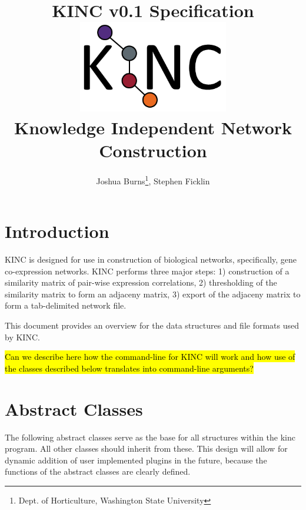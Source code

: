 \documentclass[10pt]{article}
\begin{document}
\title{\textbf{KINC v0.1 Specification}\\
\vspace{1mm}
\includegraphics[width=8cm,height=4cm]{KINClogo.png}
\\Knowledge Independent Network Construction}
\author{Joshua Burns\thanks{Dept. of Horticulture, Washington State University}, Stephen Ficklin\footnotemark[1]}
\maketitle

\newpage
\tableofcontents

\newpage
\section{Introduction}

KINC is designed for use in construction of biological networks, specifically, 
gene co-expression networks. KINC performs three major steps:  1) construction
of a similarity matrix of pair-wise expression correlations, 2) thresholding of 
the similarity matrix to form an adjaceny matrix, 3) export of the adjaceny 
matrix to form a tab-delimited network file.  

This document provides an overview for the data structures and file formats used 
by KINC. 

\hl{Can we describe here how the command-line for KINC will work and how
use of the classes described below translates into command-line arguments?}

\newpage
\section{Abstract Classes}

The following abstract classes serve as the base for all structures within the 
kinc program.  All other classes should inherit from these. This design will 
allow for dynamic addition of user implemented plugins in the future, because
the functions of the abstract classes are clearly defined.
\end{document}
